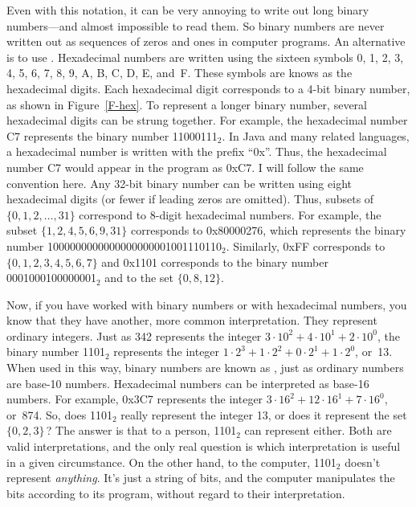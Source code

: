 Even with this notation, it can be very annoying to write out long
binary numbers---and almost impossible to read them.  So binary numbers
are never written out as sequences of zeros and ones in computer
programs.  An alternative is to use .  Hexadecimal numbers are written using the sixteen
symbols 0, 1, 2, 3, 4, 5, 6, 7, 8, 9, A, B, C, D, E, and~F.
These symbols are knows as the hexadecimal digits.  Each hexadecimal
digit corresponds to a 4-bit binary number, as shown in 
Figure~\ref{F-hex}.  To represent a longer binary number, several
hexadecimal digits can be strung together.  For example,
the hexadecimal number C7 represents the binary number 
11000111$_2$.  In Java and many related languages, a hexadecimal
number is written with the prefix ``0x''.  Thus, the hexadecimal
number C7 would appear in the program as 0xC7.  I will follow
the same convention here.  Any 32-bit binary number can be written
using eight hexadecimal digits (or fewer if leading zeros are omitted).
Thus, subsets of $\{0,1,2,\dots,31\}$ correspond to 
8-digit hexadecimal numbers.  For example,
the subset $\{1,2,4,5,6,9,31\}$ corresponds to
0x80000276, which represents the binary number
1000000000000000000001001110110$_2$.  Similarly,
0xFF corresponds to $\{0,1,2,3,4,5,6,7\}$ and
0x1101 corresponds to the binary number 0001000100000001$_2$
and to the set $\{0,8,12\}$.

Now, if you have worked with binary numbers or with hexadecimal
numbers, you know that they have another, more common interpretation.
They represent ordinary integers.  Just as 342 represents the
integer $3\cdot 10^2 + 4\cdot 10^1 +2\cdot 10^0$, the
binary number 1101$_2$ represents the integer
$1\cdot 2^3 +1\cdot 2^2 +0\cdot 2^1 +1\cdot 2^0$, or~13.
When used in this way, binary numbers are known as 
, just as ordinary numbers
are base-10 numbers.  Hexadecimal numbers can be interpreted
as base-16 numbers.  For example, 0x3C7 represents the
integer $3\cdot 16^2 + 12\cdot 16^1 + 7\cdot 16^0$, or~874.
So, does 1101$_2$ really represent the integer 13, or does it
represent the set $\{0,2,3\}\,$?  The answer is that to a person,
1101$_2$ can represent either.  Both are valid interpretations,
and the only real question is which interpretation is useful in
a given circumstance.  On the other hand, to the computer,
1101$_2$ doesn't represent \emph{anything}.  It's just a string
of bits, and the computer manipulates the bits according to its
program, without regard to their interpretation.

